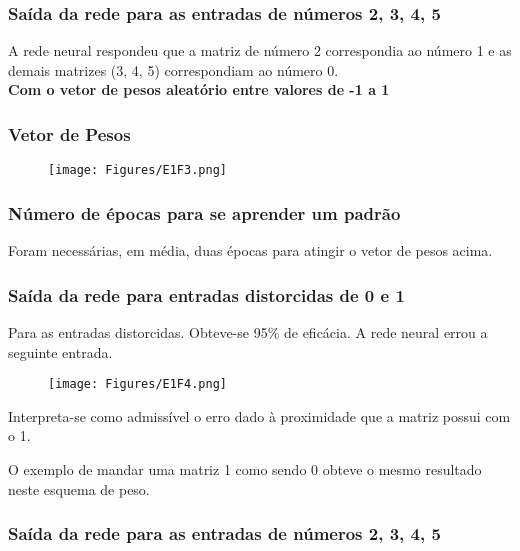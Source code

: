 \documentclass[hidelinks,12pt]{article}
\begin{document}
		\subsubsection{Saída da rede para as entradas de números 2, 3, 4, 5}
		
		A rede neural respondeu que a matriz de número 2 correspondia ao número 1 e as demais matrizes (3, 4, 5) correspondiam ao número 0.\\
		
		\textbf{\large Com o vetor de pesos aleatório entre valores de -1 a 1}
		
		\subsubsection{Vetor de Pesos}
		
		\begin{figure}[!h]
			\centering
			\texttt{[image: Figures/E1F3.png]}
		\end{figure}
		
		\subsubsection{Número de épocas para se aprender um padrão}
		
		Foram necessárias, em média, duas épocas para atingir o vetor de pesos acima.
		
		\subsubsection{Saída da rede para entradas distorcidas de 0 e 1}
		
		Para as entradas distorcidas. Obteve-se 95\% de eficácia. A rede neural errou a seguinte entrada.
		
		\begin{figure}[!h]
			\centering
			\texttt{[image: Figures/E1F4.png]}
		\end{figure}
		
		Interpreta-se como admissível o erro dado à proximidade que a matriz possui com o 1.	
	
		O exemplo de mandar uma matriz 1 como sendo 0 obteve o mesmo resultado neste esquema de peso.
		
		\subsubsection{Saída da rede para as entradas de números 2, 3, 4, 5}
		
\end{document}
